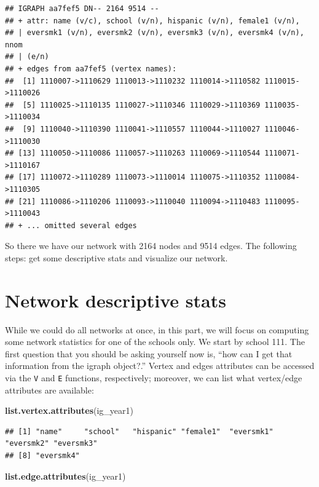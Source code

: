 \documentclass[
]{book}
\newenvironment{Shaded}{\begin{snugshade}}{\end{snugshade}}
\newcommand{\FunctionTok}[1]{\textcolor[rgb]{0.13,0.29,0.53}{\textbf{#1}}}
\newcommand{\NormalTok}[1]{#1}
\begin{document}
\begin{verbatim}
## IGRAPH aa7fef5 DN-- 2164 9514 -- 
## + attr: name (v/c), school (v/n), hispanic (v/n), female1 (v/n),
## | eversmk1 (v/n), eversmk2 (v/n), eversmk3 (v/n), eversmk4 (v/n), nnom
## | (e/n)
## + edges from aa7fef5 (vertex names):
##  [1] 1110007->1110629 1110013->1110232 1110014->1110582 1110015->1110026
##  [5] 1110025->1110135 1110027->1110346 1110029->1110369 1110035->1110034
##  [9] 1110040->1110390 1110041->1110557 1110044->1110027 1110046->1110030
## [13] 1110050->1110086 1110057->1110263 1110069->1110544 1110071->1110167
## [17] 1110072->1110289 1110073->1110014 1110075->1110352 1110084->1110305
## [21] 1110086->1110206 1110093->1110040 1110094->1110483 1110095->1110043
## + ... omitted several edges
\end{verbatim}

So there we have our network with 2164 nodes and 9514 edges. The following steps: get some descriptive stats and visualize our network.

\hypertarget{network-descriptive-stats}{%
\section{Network descriptive stats}\label{network-descriptive-stats}}

While we could do all networks at once, in this part, we will focus on computing some network statistics for one of the schools only. We start by school 111. The first question that you should be asking yourself now is, ``how can I get that information from the igraph object?.'' Vertex and edges attributes can be accessed via the \texttt{V} and \texttt{E} functions, respectively; moreover, we can list what vertex/edge attributes are available:

\begin{Shaded}
\begin{Highlighting}[]
\FunctionTok{list.vertex.attributes}\NormalTok{(ig\_year1)}
\end{Highlighting}
\end{Shaded}

\begin{verbatim}
## [1] "name"     "school"   "hispanic" "female1"  "eversmk1" "eversmk2" "eversmk3"
## [8] "eversmk4"
\end{verbatim}

\begin{Shaded}
\begin{Highlighting}[]
\FunctionTok{list.edge.attributes}\NormalTok{(ig\_year1) }
\end{Highlighting}
\end{Shaded}
\end{document}

